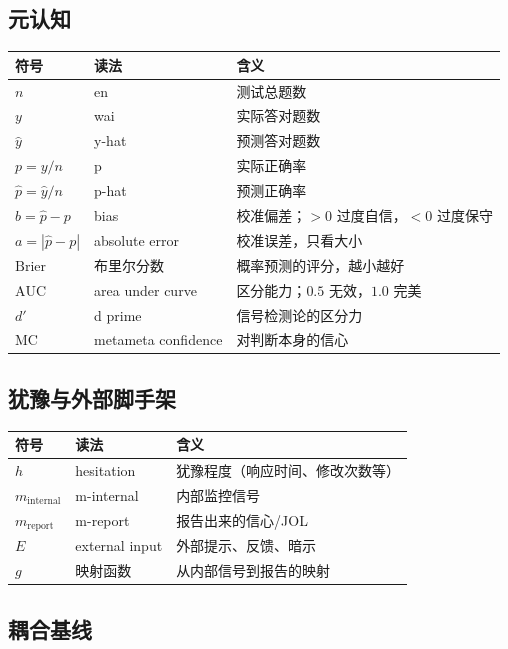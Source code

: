\documentclass[UTF8,a4paper,11pt]{ctexart}
\begin{document}
\subsection{元认知}

\begin{longtable}{@{}p{3.0cm}p{4.8cm}p{6.4cm}@{}}
\toprule
\textbf{符号} & \textbf{读法} & \textbf{含义} \\
\midrule
$n$ & en & 测试总题数 \\
$y$ & wai & 实际答对题数 \\
$\hat y$ & y-hat & 预测答对题数 \\
$p=y/n$ & p & 实际正确率 \\
$\hat p=\hat y/n$ & p-hat & 预测正确率 \\
$b=\hat p-p$ & bias & 校准偏差；$>0$ 过度自信，$<0$ 过度保守 \\
$a=|\hat p-p|$ & absolute error & 校准误差，只看大小 \\
$\mathrm{Brier}$ & 布里尔分数 & 概率预测的评分，越小越好 \\
$\mathrm{AUC}$ & area under curve & 区分能力；$0.5$ 无效，$1.0$ 完美 \\
$d'$ & d prime & 信号检测论的区分力 \\
$\mathrm{MC}$ & metameta confidence & 对判断本身的信心 \\
\bottomrule
\end{longtable}

\subsection{犹豫与外部脚手架}

\begin{longtable}{@{}p{3.0cm}p{4.8cm}p{6.4cm}@{}}
\toprule
\textbf{符号} & \textbf{读法} & \textbf{含义} \\
\midrule
$h$ & hesitation & 犹豫程度（响应时间、修改次数等） \\
$m_{\text{internal}}$ & m-internal & 内部监控信号 \\
$m_{\text{report}}$ & m-report & 报告出来的信心/JOL \\
$E$ & external input & 外部提示、反馈、暗示 \\
$g$ & 映射函数 & 从内部信号到报告的映射 \\
\bottomrule
\end{longtable}

\subsection{耦合基线}
\end{document}
